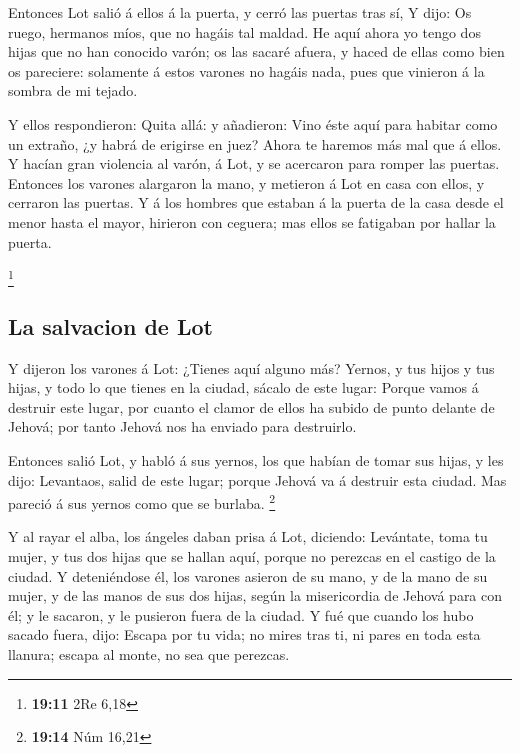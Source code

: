  Entonces Lot salió á ellos á la puerta, y cerró las puertas
tras sí,  Y dijo: Os ruego, hermanos míos, que no hagáis tal
maldad.  He aquí ahora yo tengo dos hijas que no han
conocido varón; os las sacaré afuera, y haced de ellas como bien os
pareciere: solamente á estos varones no hagáis nada, pues que vinieron á
la sombra de mi tejado.

 Y ellos respondieron: Quita allá: y añadieron: Vino éste
aquí para habitar como un extraño, ¿y habrá de erigirse en juez? Ahora
te haremos más mal que á ellos. Y hacían gran violencia al varón, á Lot,
y se acercaron para romper las puertas.  Entonces los
varones alargaron la mano, y metieron á Lot en casa con ellos, y
cerraron las puertas.  Y á los hombres que estaban á la
puerta de la casa desde el menor hasta el mayor, hirieron con ceguera;
mas ellos se fatigaban por hallar la puerta.

\footnote{\textbf{19:11} 2Re 6,18}

\hypertarget{la-salvacion-de-lot}{%
\subsection{La salvacion de Lot}\label{la-salvacion-de-lot}}

 Y dijeron los varones á Lot: ¿Tienes aquí alguno más?
Yernos, y tus hijos y tus hijas, y todo lo que tienes en la ciudad,
sácalo de este lugar:  Porque vamos á destruir este lugar,
por cuanto el clamor de ellos ha subido de punto delante de Jehová; por
tanto Jehová nos ha enviado para destruirlo.

 Entonces salió Lot, y habló á sus yernos, los que habían
de tomar sus hijas, y les dijo: Levantaos, salid de este lugar; porque
Jehová va á destruir esta ciudad. Mas pareció á sus yernos como que se
burlaba. \footnote{\textbf{19:14} Núm 16,21}

 Y al rayar el alba, los ángeles daban prisa á Lot,
diciendo: Levántate, toma tu mujer, y tus dos hijas que se hallan aquí,
porque no perezcas en el castigo de la ciudad.  Y
deteniéndose él, los varones asieron de su mano, y de la mano de su
mujer, y de las manos de sus dos hijas, según la misericordia de Jehová
para con él; y le sacaron, y le pusieron fuera de la ciudad.
 Y fué que cuando los hubo sacado fuera, dijo: Escapa por
tu vida; no mires tras ti, ni pares en toda esta llanura; escapa al
monte, no sea que perezcas.

